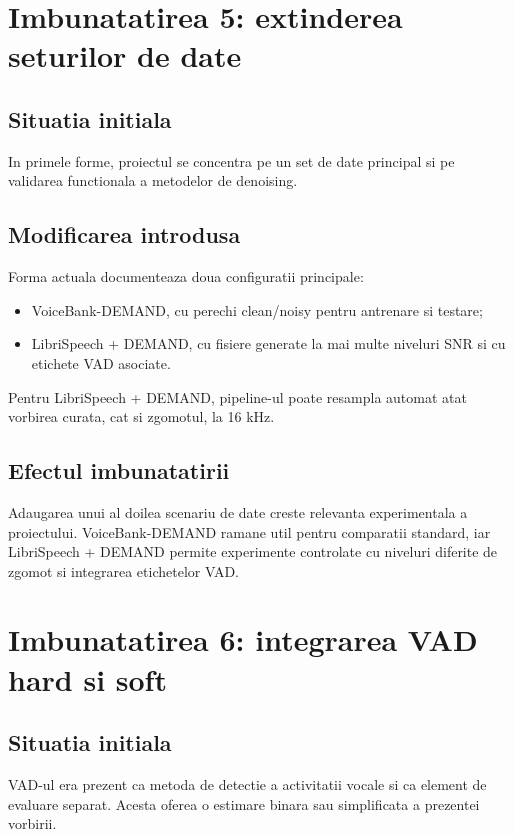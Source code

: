 \documentclass[12pt,a4paper]{article}
\begin{document}
\section{Imbunatatirea 5: extinderea seturilor de date}

\subsection{Situatia initiala}

In primele forme, proiectul se concentra pe un set de date principal si pe
validarea functionala a metodelor de denoising.

\subsection{Modificarea introdusa}

Forma actuala documenteaza doua configuratii principale:

\begin{itemize}
    \item VoiceBank-DEMAND, cu perechi clean/noisy pentru antrenare si testare;
    \item LibriSpeech + DEMAND, cu fisiere generate la mai multe niveluri SNR
    si cu etichete VAD asociate.
\end{itemize}

Pentru LibriSpeech + DEMAND, pipeline-ul poate resampla automat atat vorbirea
curata, cat si zgomotul, la 16 kHz.

\subsection{Efectul imbunatatirii}

Adaugarea unui al doilea scenariu de date creste relevanta experimentala a
proiectului. VoiceBank-DEMAND ramane util pentru comparatii standard, iar
LibriSpeech + DEMAND permite experimente controlate cu niveluri diferite de zgomot
si integrarea etichetelor VAD.

\section{Imbunatatirea 6: integrarea VAD hard si soft}

\subsection{Situatia initiala}

VAD-ul era prezent ca metoda de detectie a activitatii vocale si ca element de
evaluare separat. Acesta oferea o estimare binara sau simplificata a prezentei
vorbirii.
\end{document}
